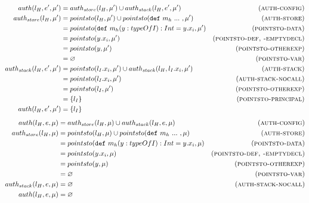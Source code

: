 \documentclass{llncs}
\newcommand{\keywadj}[1]{\mathtt{#1}}
\newcommand{\keyw}[1]{\keywadj{#1}~}
\begin{document}
\begin{align*}
auth(l_H, e', \mu') &= auth_{store}(l_H, \mu') \cup auth_{stack}(l_H, e', \mu') & (\textsc{auth-config})\\
auth_{store}(l_H, \mu') &= pointsto(l_H, \mu') \cup pointsto(\keyw{def} m_h~...~, \mu') & (\textsc{auth-store})\\
 &= pointsto(\keyw{def} m_h(y : typeOfI) : Int = y.x_i, \mu') & (\textsc{pointsto-data})\\
 &= pointsto(y.x_i, \mu') & (\textsc{pointsto-def, -emptydecl})\\
 &= pointsto(y, \mu') & (\textsc{pointsto-otherexp})\\
 &= \varnothing & (\textsc{pointsto-var})\\
auth_{stack}(l_H, e', \mu') &= pointsto(l_I.x_i, \mu') \cup auth_{stack}(l_H, l_I.x_i, \mu') & (\textsc{auth-stack})\\
 &= pointsto(l_I.x_i, \mu') & (\textsc{auth-stack-nocall})\\
 &= pointsto(l_I, \mu') & (\textsc{pointsto-otherexp})\\
 &= \{ l_I \} & (\textsc{pointsto-principal})\\
auth(l_H, e', \mu') &= \{ l_I \} &\\
\end{align*}
\begin{align*}
auth(l_H, e, \mu) &= auth_{store}(l_H, \mu) \cup auth_{stack}(l_H, e, \mu) & (\textsc{auth-config})\\
auth_{store}(l_H, \mu) &= pointsto(l_H, \mu) \cup pointsto(\keyw{def} m_h~...~, \mu) & (\textsc{auth-store})\\
 &= pointsto(\keyw{def} m_h(y : typeOfI) : Int = y.x_i, \mu) & (\textsc{pointsto-data})\\
 &= pointsto(y.x_i, \mu) & (\textsc{pointsto-def, -emptydecl})\\
 &= pointsto(y, \mu) & (\textsc{pointsto-otherexp})\\
 &= \varnothing & (\textsc{pointsto-var})\\
auth_{stack}(l_H, e, \mu) &= \varnothing & (\textsc{auth-stack-nocall})\\
auth(l_H, e, \mu) &=  \varnothing &\\
\end{align*}


\newpage

\noindent\underline{}

\vspace{16pt}
\end{document}
